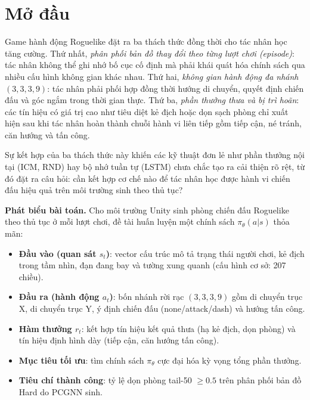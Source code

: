 \clearpage
{}

\chapter*{Mở đầu}


Game hành động Roguelike đặt ra ba thách thức đồng thời cho tác nhân học tăng cường. Thứ nhất, \textit{phân phối bản đồ thay đổi theo từng lượt chơi (episode)}: tác nhân không thể ghi nhớ bố cục cố định mà phải khái quát hóa chính sách qua nhiều cấu hình không gian khác nhau. Thứ hai, \textit{không gian hành động đa nhánh $(3,3,3,9)$}: tác nhân phải phối hợp đồng thời hướng di chuyển, quyết định chiến đấu và góc ngắm trong thời gian thực. Thứ ba, \textit{phần thưởng thưa và bị trì hoãn}: các tín hiệu có giá trị cao như tiêu diệt kẻ địch hoặc dọn sạch phòng chỉ xuất hiện sau khi tác nhân hoàn thành chuỗi hành vi liên tiếp gồm tiếp cận, né tránh, căn hướng và tấn công.

Sự kết hợp của ba thách thức này khiến các kỹ thuật đơn lẻ như phần thưởng nội tại (ICM, RND) hay bộ nhớ tuần tự (LSTM) chưa chắc tạo ra cải thiện rõ rệt, từ đó đặt ra câu hỏi: cần kết hợp cơ chế nào để tác nhân học được hành vi chiến đấu hiệu quả trên môi trường sinh theo thủ tục?

\vspace{0.3cm}
\noindent\textbf{Phát biểu bài toán.} Cho môi trường Unity sinh phòng chiến đấu Roguelike theo thủ tục ở mỗi lượt chơi, đề tài huấn luyện một chính sách $\pi_\theta(a|s)$ thỏa mãn:

\begin{itemize}
    \item \textbf{Đầu vào (quan sát $s_t$)}: vector cấu trúc mô tả trạng thái người chơi, kẻ địch trong tầm nhìn, đạn đang bay và tường xung quanh (cấu hình cơ sở: 207 chiều).
    \item \textbf{Đầu ra (hành động $a_t$)}: bốn nhánh rời rạc $(3,3,3,9)$ gồm di chuyển trục X, di chuyển trục Y, ý định chiến đấu (none/attack/dash) và hướng tấn công.
    \item \textbf{Hàm thưởng $r_t$}: kết hợp tín hiệu kết quả thưa (hạ kẻ địch, dọn phòng) và tín hiệu định hình dày (tiếp cận, căn hướng tấn công).
    \item \textbf{Mục tiêu tối ưu}: tìm chính sách $\pi_\theta$ cực đại hóa kỳ vọng tổng phần thưởng.
    \item \textbf{Tiêu chí thành công}: tỷ lệ dọn phòng tail-50 $\geq 0.5$ trên phân phối bản đồ Hard do PCGNN sinh.
\end{itemize}

